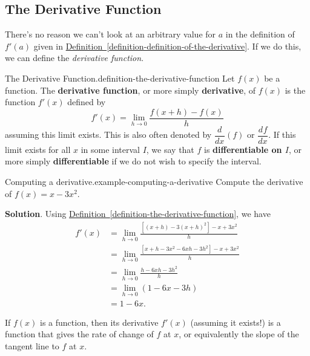 \documentclass[10pt,]{book}
\newcommand{\terminology}[1]{\textbf{#1}}
\numberwithin{equation}{section}
\newcommand{\dv}[3][]{\dfrac{d^{#1} #2}{d #3^{#1}}}
\begin{document}
\subsection[{The Derivative Function}]{The Derivative Function}\label{subsection-the-derivative-function}
\hypertarget{p-100}{}%
There's no reason we can't look at an arbitrary value for \(a\) in the definition of \(f'(a)\) given in \hyperref[definition-definition-of-the-derivative]{Definition~\ref{definition-definition-of-the-derivative}}. If we do this, we can define the \emph{derivative function}.%
\begin{definition}{The Derivative Function.}{definition-the-derivative-function}%
\hypertarget{p-101}{}%
Let \(f(x)\) be a function. The \terminology{derivative function}, or more simply \terminology{derivative}, of \(f(x)\) is the function \(f'(x)\) defined by%
\begin{equation*}
f'(x) = \lim_{h\to0}\frac{f(x+h) - f(x)}{h}
\end{equation*}
assuming this limit exists. This is also often denoted by \(\dv{}{x}(f)\) or \(\dv{f}{x}\). If this limit exists for all \(x\) in some interval \(I\), we say that \(f\) is \terminology{differentiable on \(I\)}, or more simply \terminology{differentiable} if we do not wish to specify the interval.%
\end{definition}
\begin{example}{Computing a derivative.}{example-computing-a-derivative}%
\hypertarget{p-102}{}%
Compute the derivative of \(f(x) = x - 3x^{2}\).%
\par\smallskip%
\noindent\textbf{Solution}.\hypertarget{solution-22}{}\quad%
\hypertarget{p-103}{}%
Using \hyperref[definition-the-derivative-function]{Definition~\ref{definition-the-derivative-function}}, we have%
\begin{align*}
f'(x) & = \lim_{h\to0}\frac{[(x+h)-3(x+h)^{2}] - x + 3x^{2}}{h} \\
& = \lim_{h\to0}\frac{[x+h-3x^{2}-6xh-3h^{2}] - x + 3x^{2}}{h} \\
& = \lim_{h\to0}\frac{h-6xh-3h^{2}}{h} \\
& = \lim_{h\to0}(1-6x-3h) \\
& = 1-6x. 
\end{align*}
%
\end{example}
\hypertarget{p-104}{}%
If \(f(x)\) is a function, then its derivative \(f'(x)\) (assuming it exists!) is a function that gives the rate of change of \(f\) at \(x\), or equivalently the slope of the tangent line to \(f\) at \(x\).%
\end{document}
